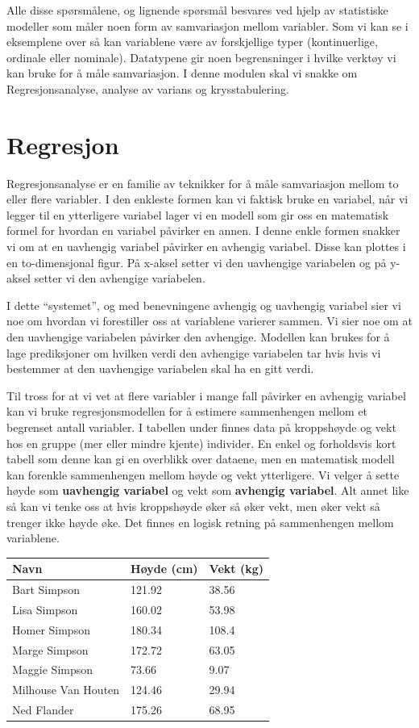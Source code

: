 \documentclass[
  letterpaper,
  DIV=11,
  numbers=noendperiod,
  oneside]{scrreprt}
\begin{document}
Alle disse spørsmålene, og lignende spørsmål besvares ved hjelp av
statistiske modeller som måler noen form av samvariasjon mellom
variabler. Som vi kan se i eksemplene over så kan variablene være av
forskjellige typer (kontinuerlige, ordinale eller nominale). Datatypene
gir noen begrensninger i hvilke verktøy vi kan bruke for å måle
samvariasjon. I denne modulen skal vi snakke om Regresjonsanalyse,
analyse av varians og krysstabulering.

\hypertarget{regresjon}{%
\section{Regresjon}\label{regresjon}}

Regresjonsanalyse er en familie av teknikker for å måle samvariasjon
mellom to eller flere variabler. I den enkleste formen kan vi faktisk
bruke en variabel, når vi legger til en ytterligere variabel lager vi en
modell som gir oss en matematisk formel for hvordan en variabel påvirker
en annen. I denne enkle formen snakker vi om at en uavhengig variabel
påvirker en avhengig variabel. Disse kan plottes i en to-dimensjonal
figur. På x-aksel setter vi den uavhengige variabelen og på y-aksel
setter vi den avhengige variabelen.

I dette ``systemet'', og med benevningene avhengig og uavhengig variabel
sier vi noe om hvordan vi forestiller oss at variablene varierer sammen.
Vi sier noe om at den uavhengige variabelen påvirker den avhengige.
Modellen kan brukes for å lage prediksjoner om hvilken verdi den
avhengige variabelen tar hvis hvis vi bestemmer at den uavhengige
variabelen skal ha en gitt verdi.

Til tross for at vi vet at flere variabler i mange fall påvirker en
avhengig variabel kan vi bruke regresjonsmodellen for å estimere
sammenhengen mellom et begrenset antall variabler. I tabellen under
finnes data på kroppshøyde og vekt hos en gruppe (mer eller mindre
kjente) individer. En enkel og forholdsvis kort tabell som denne kan gi
en overblikk over dataene, men en matematisk modell kan forenkle
sammenhengen mellom høyde og vekt ytterligere. Vi velger å sette høyde
som \textbf{uavhengig variabel} og vekt som \textbf{avhengig variabel}.
Alt annet like så kan vi tenke oss at hvis kroppshøyde øker så øker
vekt, men øker vekt så trenger ikke høyde øke. Det finnes en logisk
retning på sammenhengen mellom variablene.

\begin{longtable}[]{@{}lll@{}}
\toprule\noalign{}
Navn & Høyde (cm) & Vekt (kg) \\
\midrule\noalign{}
\endhead
\bottomrule\noalign{}
\endlastfoot
Bart Simpson & 121.92 & 38.56 \\
Lisa Simpson & 160.02 & 53.98 \\
Homer Simpson & 180.34 & 108.4 \\
Marge Simpson & 172.72 & 63.05 \\
Maggie Simpson & 73.66 & 9.07 \\
Milhouse Van Houten & 124.46 & 29.94 \\
Ned Flander & 175.26 & 68.95 \\
\end{longtable}
\end{document}
